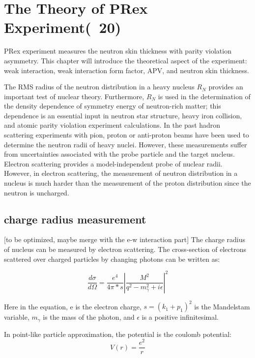 \chapter{The Theory of PRex Experiment(~20)}

PRex experiment measures the neutron skin thickness with parity violation asymmetry. This chapter will introduce the theoretical aspect of the experiment: weak interaction, weak interaction form factor, APV, and neutron skin thickness.

The RMS radius of the  neutron distribution in a heavy nucleus  $R_N$ provides an important test of nuclear theory. Furthermore,   $R_N$ is used in the determination of  the density dependence of symmetry energy of neutron-rich matter; this dependence is an  essential input in   neutron star structure, heavy iron collision, and atomic parity violation experiment calculations. In the past hadron scattering experiments with pion, proton or anti-proton beams have been used to determine the neutron radii of heavy nuclei. However, these measurements suffer from uncertainties associated with the probe particle and the target nucleus. Electron scattering provides a model-independent probe of nuclear radii.  However, in electron scattering, the measurement of neutron distribution in a nucleus  is much harder than the measurement of the proton distribution  since the neutron is uncharged. 

\section{charge radius measurement}
[to be optimized, maybe merge with the e-w interaction part]
The charge radius of nucleus can be measured by electron scattering. The cross-section of electrons scattered over charged particles by changing photons can be written as:

\begin{equation}
    \frac{d\sigma}{d\Omega} = \frac{e^4}{4\pi*s}|\frac{M^2}{q^2 - m^2_\gamma + i\epsilon}|^2
\end{equation}

Here in the equation,  e is the electron charge, $s = (k_1 + p_1)^2$ is the Mandelstam variable, $m_\gamma$ is the mass of the photon, and $\epsilon$ is a positive infinitesimal. 

In point-like particle approximation, the potential is the coulomb potential: 
\begin{equation}
    V(r) = \frac{e^2}{r}
\end{equation}

